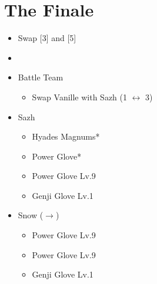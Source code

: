 \chapter{The Finale}

\begin{menu}
	\begin{itemize}
	\paradigm
		\begin{itemize}
			\item Swap [3] and [5]
			\item {}%
				{\paradigmline{\com}{\com}{\com}}%
				{\paradigmline[4]{(\med)}{(\com)}{(\com)}}%
				{\paradigmline{\med}{(\sen)}{\syn}}%
				{\paradigmline{(\rav)}{(\rav)}{(\syn)}}%
				{\paradigmline{(\sab)}{(\rav)}{\rav}}%
				{\paradigmline{(\rav)}{(\rav)}{(\rav)}}%
			\item Battle Team
				\begin{itemize}
					\item Swap Vanille with Sazh (1 $\leftrightarrow$ 3)
				\end{itemize}
		\end{itemize}
	\equip
		\begin{itemize}
			\item Sazh
				\begin{itemize}
					\item Hyades Magnums*
					\item Power Glove*
					\item Power Glove Lv.9
					\item Genji Glove Lv.1
				\end{itemize}
			\item Snow ($\rightarrow$)
				\begin{itemize}
					\item Power Glove Lv.9
					\item Power Glove Lv.9
					\item Genji Glove Lv.1
				\end{itemize}
		\end{itemize}
	\end{itemize}
\end{menu}

\renewcommand{\first}{[1] Cerberus (\com/\com/\com)}
\renewcommand{\second}{[2] Tireless Charge (\com/\com/\med)}
\renewcommand{\third}{[3] Protection (\syn/\sen/\med)}
\renewcommand{\fourth}{[4] Malevolence (\syn/\rav/\rav)}
\renewcommand{\fifth}{[5] Smart Bomb (\rav/\rav/\sab)}
\renewcommand{\sixth}{[6] Tri-Disaster (\rav/\rav/\rav)}

